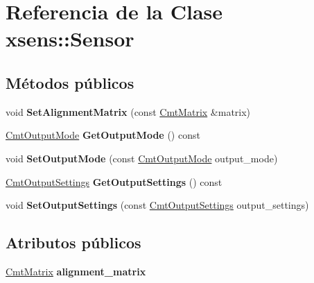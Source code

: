 \hypertarget{classxsens_1_1Sensor}{\section{\-Referencia de la \-Clase xsens\-:\-:\-Sensor}
\label{classxsens_1_1Sensor}
}
\subsection*{\-Métodos públicos}
\begin{DoxyCompactItemize}
\item 
\hypertarget{classxsens_1_1Sensor_a40257e9b50a0b72903f8887f36df5c89}{void {\bfseries \-Set\-Alignment\-Matrix} (const \hyperlink{structCmtMatrix}{\-Cmt\-Matrix} \&matrix)}\label{classxsens_1_1Sensor_a40257e9b50a0b72903f8887f36df5c89}

\item 
\hypertarget{classxsens_1_1Sensor_af766afc08b55ea69a5da6aca4c66e57d}{\hyperlink{cmtdef_8h_a85df1cdea0bf11e38292e3cd5d69e747}{\-Cmt\-Output\-Mode} {\bfseries \-Get\-Output\-Mode} () const }\label{classxsens_1_1Sensor_af766afc08b55ea69a5da6aca4c66e57d}

\item 
\hypertarget{classxsens_1_1Sensor_aec35e5ad5ebb68f20d30b3b9305b3ce2}{void {\bfseries \-Set\-Output\-Mode} (const \hyperlink{cmtdef_8h_a85df1cdea0bf11e38292e3cd5d69e747}{\-Cmt\-Output\-Mode} output\-\_\-mode)}\label{classxsens_1_1Sensor_aec35e5ad5ebb68f20d30b3b9305b3ce2}

\item 
\hypertarget{classxsens_1_1Sensor_a4e958f5752084ec4ce03468ff7802e84}{\hyperlink{cmtdef_8h_a4125efede0d0948ee49291165a1d089b}{\-Cmt\-Output\-Settings} {\bfseries \-Get\-Output\-Settings} () const }\label{classxsens_1_1Sensor_a4e958f5752084ec4ce03468ff7802e84}

\item 
\hypertarget{classxsens_1_1Sensor_a25d12bfc6f9db5256c2623175151241c}{void {\bfseries \-Set\-Output\-Settings} (const \hyperlink{cmtdef_8h_a4125efede0d0948ee49291165a1d089b}{\-Cmt\-Output\-Settings} output\-\_\-settings)}\label{classxsens_1_1Sensor_a25d12bfc6f9db5256c2623175151241c}

\end{DoxyCompactItemize}
\subsection*{\-Atributos públicos}
\begin{DoxyCompactItemize}
\item 
\hypertarget{classxsens_1_1Sensor_ae5bc78eaaddb660cea66edae6735d33c}{\hyperlink{structCmtMatrix}{\-Cmt\-Matrix} {\bfseries alignment\-\_\-matrix}}\label{classxsens_1_1Sensor_ae5bc78eaaddb660cea66edae6735d33c}

\end{DoxyCompactItemize}
